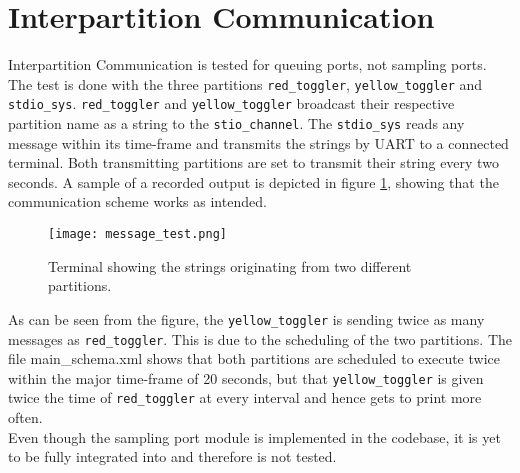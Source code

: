 \section{Interpartition Communication}
Interpartition Communication is tested for queuing ports, not sampling ports.
The test is done with the three partitions \texttt{red\_toggler},
\texttt{yellow\_toggler} and \texttt{stdio\_sys}. \texttt{red\_toggler} and
\texttt{yellow\_toggler} broadcast their respective partition name as a string
to the \texttt{stio\_channel}. The \texttt{stdio\_sys} reads any message within its
time-frame and transmits the strings by UART to a connected terminal. Both
transmitting partitions are set to transmit their string every two seconds. A
sample of a recorded output is depicted in figure \ref{fig:message_test},
showing that the communication scheme works as intended.

\begin{figure}[H]
	\centering
	\texttt{[image: message\_test.png]}
	\caption{Terminal showing the strings originating from two different
		partitions.}
	\label{fig:message_test}
\end{figure}

As can be seen from the figure, the \texttt{yellow\_toggler} is sending twice as
many messages as \texttt{red\_toggler}. This is due to the scheduling of the two
partitions. The file main\_schema.xml shows that both partitions are
scheduled to execute twice within the major time-frame of 20 seconds, but that
\texttt{yellow\_toggler} is given twice the time of \texttt{red\_toggler} at
every interval and hence gets to print more often.\\

Even though the sampling port module is implemented in the codebase, it is yet
to be fully integrated into \OSname{} and therefore is not tested.
